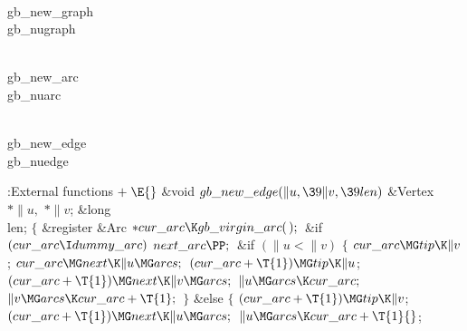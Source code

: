 \Y\B\4\D\\{gb\_new\_graph}\5
\\{gb\_nugraph}\par
\B\4\D\\{gb\_new\_arc}\5
\\{gb\_nuarc}\par
\B\4\D\\{gb\_new\_edge}\5
\\{gb\_nuedge}\par
\Y\B\4:External functions\X${}\mathrel+\E{}$\6
\1\1\&{void} ${}\\{gb\_new\_edge}(\|u,\39\|v,\39\\{len}){}$\6
\&{Vertex} ${}{*}\|u,{}$ ${}{*}\|v{}$;\6
\&{long} \\{len};\2\2\6
${}\{{}$\5
\1\&{register} \&{Arc} ${}{*}\\{cur\_arc}\K\\{gb\_virgin\_arc}(\,);{}$\7
\&{if} ${}(\\{cur\_arc}\I\\{dummy\_arc}){}$\1\5
${}\\{next\_arc}\PP;{}$\2\6
\&{if} ${}(\|u<\|v){}$\5
${}\{{}$\1\6
${}\\{cur\_arc}\MG\\{tip}\K\|v{}$;\5
${}\\{cur\_arc}\MG\\{next}\K\|u\MG\\{arcs};{}$\6
${}(\\{cur\_arc}+\T{1})\MG\\{tip}\K\|u{}$;\5
${}(\\{cur\_arc}+\T{1})\MG\\{next}\K\|v\MG\\{arcs};{}$\6
${}\|u\MG\\{arcs}\K\\{cur\_arc};{}$\6
${}\|v\MG\\{arcs}\K\\{cur\_arc}+\T{1};{}$\6
\4${}\}{}$\5
\2\&{else}\5
${}\{{}$\1\6
${}(\\{cur\_arc}+\T{1})\MG\\{tip}\K\|v{}$;\5
${}(\\{cur\_arc}+\T{1})\MG\\{next}\K\|u\MG\\{arcs};{}$\6
${}\|u\MG\\{arcs}\K\\{cur\_arc}+\T{1}{}$;\6
